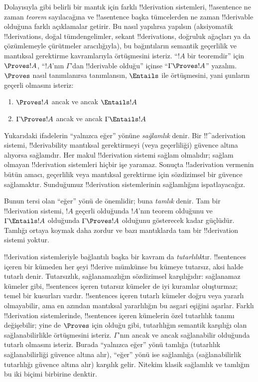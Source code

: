 \documentclass[../../../include/open-logic-section]{subfiles}
\begin{document}
Dolayısıyla  gibi
belirli bir mantık için farklı
!!{derivation} sistemleri, !!a{sentence} ne zaman \emph{teorem} sayılacağına
ve !!a{sentence} başka tümcelerden ne zaman !!{derivable} olduğuna farklı
açıklamalar getirir. Bu nasıl yapılırsa yapılsın (aksiyomatik !!{derivation}s,
doğal tümdengelimler, sekant !!{derivation}s, doğruluk ağaçları ya da
çözümlemeyle çürütmeler aracılığıyla), bu bağıntıların semantik geçerlilik ve
mantıksal gerektirme kavramlarıyla örtüşmesini isteriz. “$!A$ bir teoremdir”
için $\Proves !A$, “$!A$'nın $\Gamma$'dan !!{derivable} olduğu” içinse
“$\Gamma \Proves !A$” yazalım. $\Proves$ nasıl tanımlanırsa tanımlansın,
$\Entails$ ile örtüşmesini, yani şunların geçerli olmasını isteriz:
\begin{enumerate}
\item $\Proves !A$ ancak ve ancak $\Entails !A$
\item $\Gamma \Proves !A$ ancak ve ancak $\Gamma \Entails !A$
\end{enumerate}
Yukarıdaki ifadelerin “yalnızca eğer” yönüne \emph{sağlamlık} denir.
Bir !!^a{derivation} sistemi, !!{derivability} mantıksal gerektirmeyi (veya
geçerliliği) güvence altına alıyorsa sağlamdır. Her makul !!{derivation}
sistemi sağlam olmalıdır; sağlam olmayan !!{derivation} sistemleri hiçbir işe
yaramaz. Sonuçta !!a{derivation} vermenin bütün amacı, geçerlilik veya
mantıksal gerektirme için sözdizimsel bir güvence sağlamaktır. Sunduğumuz
!!{derivation} sistemlerinin sağlamlığını ispatlayacağız.

Bunun tersi olan “eğer” yönü de önemlidir; buna \emph{tamlık} denir. Tam bir
!!{derivation} sistemi, $!A$ geçerli olduğunda $!A$'nın teorem olduğunu ve
$\Gamma \Entails !A$ olduğunda $\Gamma \Proves !A$ olduğunu gösterecek kadar
güçlüdür. Tamlığı ortaya koymak daha zordur ve bazı mantıklarda tam bir
!!{derivation} sistemi yoktur.

!!{derivation} sistemleriyle bağlantılı başka bir kavram da
\emph{tutarlılık}tır. !!{sentence}s içeren bir kümeden her şeyi
!!{derive} mümkünse bu kümeye tutarsız, aksi halde tutarlı denir. Tutarsızlık,
sağlanamazlığın sözdizimsel karşılığıdır: sağlanamaz kümeler gibi,
!!{sentence}s içeren tutarsız kümeler de iyi kuramlar oluşturmaz; temel bir
kusurları vardır. !!{sentence}s içeren tutarlı kümeler doğru veya yararlı
olmayabilir, ama en azından mantıksal yararlılığın bu asgari eşiğini aşarlar.
Farklı !!{derivation} sistemlerinde, !!{sentence}s içeren kümelerin özel
tutarlılık tanımı değişebilir; yine de $\Proves$ için olduğu gibi,
tutarlılığın semantik karşılığı olan sağlanabilirlikle örtüşmesini isteriz.
$\Gamma$'nın ancak ve ancak sağlanabilir olduğunda tutarlı olmasını isteriz.
Burada “yalnızca eğer” yönü tamlığa (tutarlılık sağlanabilirliği güvence altına
alır), “eğer” yönü ise sağlamlığa (sağlanabilirlik tutarlılığı güvence altına
alır) karşılık gelir. Nitekim klasik
 sağlamlık ve
tamlığın bu iki biçimi birbirine denktir.
\end{document}
